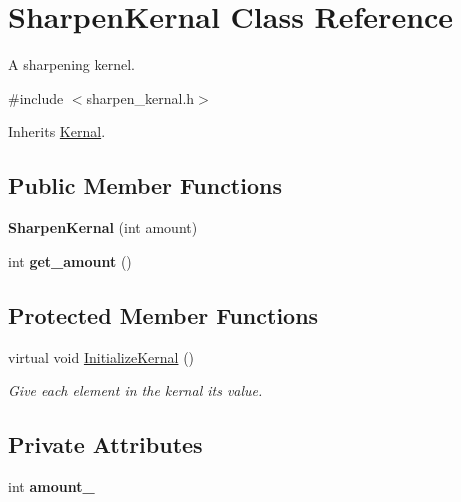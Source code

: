 \hypertarget{classSharpenKernal}{}\section{Sharpen\+Kernal Class Reference}
\label{classSharpenKernal}


A sharpening kernel.  




{\ttfamily \#include $<$sharpen\+\_\+kernal.\+h$>$}



Inherits \hyperlink{classKernal}{Kernal}.

\subsection*{Public Member Functions}
\begin{DoxyCompactItemize}
\item 
{\bfseries Sharpen\+Kernal} (int amount)\hypertarget{classSharpenKernal_ae024d6171020297791a6c2c30317e3e9}{}\label{classSharpenKernal_ae024d6171020297791a6c2c30317e3e9}

\item 
int {\bfseries get\+\_\+amount} ()\hypertarget{classSharpenKernal_a8814008974a51cc9b8b38aa3bfffb8e5}{}\label{classSharpenKernal_a8814008974a51cc9b8b38aa3bfffb8e5}

\end{DoxyCompactItemize}
\subsection*{Protected Member Functions}
\begin{DoxyCompactItemize}
\item 
virtual void \hyperlink{classSharpenKernal_ad6806183812745821914b253374e0173}{Initialize\+Kernal} ()
\begin{DoxyCompactList}\small\item\em Give each element in the kernal it\textquotesingle{}s value. \end{DoxyCompactList}\end{DoxyCompactItemize}
\subsection*{Private Attributes}
\begin{DoxyCompactItemize}
\item 
int {\bfseries amount\+\_\+}\hypertarget{classSharpenKernal_a70cbca2b72dfa222566474d92aee1c40}{}\label{classSharpenKernal_a70cbca2b72dfa222566474d92aee1c40}

\end{DoxyCompactItemize}


